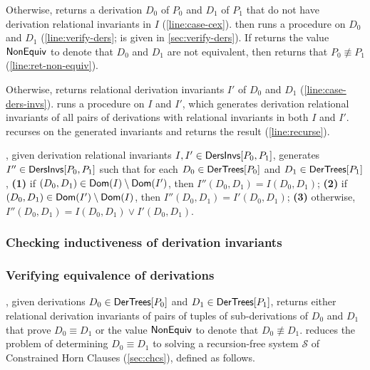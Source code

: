 Otherwise, \chkinductive returns a derivation $D_0$ of $P_0$ and $D_1$
of $P_1$ that do not have derivation relational
invariants in $I$ (\autoref{line:case-cex}).
%
\verifyaux then runs a procedure \verifyders on $D_0$ and $D_1$
(\autoref{line:verify-ders}; \verifyders is given in
\autoref{sec:verify-ders}).
%
If \verifyders returns the value $\mathsf{NonEquiv}$ to denote that $D_0$ and
$D_1$ are not equivalent, then \verifyaux returns that $P_0 \not\equiv
P_1$ (\autoref{line:ret-non-equiv}).

Otherwise, \verifyders returns relational derivation invariants $I'$
of $D_0$ and $D_1$ (\autoref{line:case-ders-invs}).
%
\verifyaux runs a procedure \mergeinvs on $I$ and $I'$, which
generates derivation relational invariants of all pairs of derivations
with relational invariants in both $I$ and $I'$.
%
\verifyaux recurses on the generated invariants and returns the result
(\autoref{line:recurse}).

\mergeinvs, given derivation relational invariants $I, I' \in
\mathsf{DersInvs}[ P_0, P_1 ]$, generates $I'' \in \mathsf{DersInvs}[ P_0, P_1 ]$ such
that for each $D_0 \in \mathsf{DerTrees}[ P_0 ]$ and $D_1 \in \mathsf{DerTrees}[ P_1 ]$, %
\textbf{(1)} if $(D_0, D_1) \in \mathsf{Dom}(I) \setminus \mathsf{Dom}(I')$,
then $I''(D_0, D_1) = I(D_0, D_1)$;
%
\textbf{(2)} if $(D_0, D_1) \in \mathsf{Dom}(I') \setminus \mathsf{Dom}(I)$,
then $I''(D_0, D_1) = I'(D_0, D_1)$; %
\textbf{(3)} otherwise, $I''(D_0, D_1) = I(D_0, D_1) \lor I'(D_0,
D_1)$.

\subsubsection{Checking inductiveness of derivation invariants}
\label{sec:chk-ind}

%

\subsubsection{Verifying equivalence of derivations}
\label{sec:verify-ders}
%
\verifyders, given derivations $D_0 \in \mathsf{DerTrees}[ P_0 ]$ and $D_1 \in
\mathsf{DerTrees}[ P_1 ]$, returns either relational derivation invariants of
pairs of tuples of sub-derivations of $D_0$ and $D_1$ that prove $D_0
\equiv D_1$ or the value $\mathsf{NonEquiv}$ to denote that $D_0 \not\equiv
D_1$.
%
\verifyders reduces the problem of determining $D_0 \equiv D_1$ to
solving a recursion-free system $\mathcal{S}$ of Constrained Horn
Clauses (\autoref{sec:chcs}), defined as follows.

